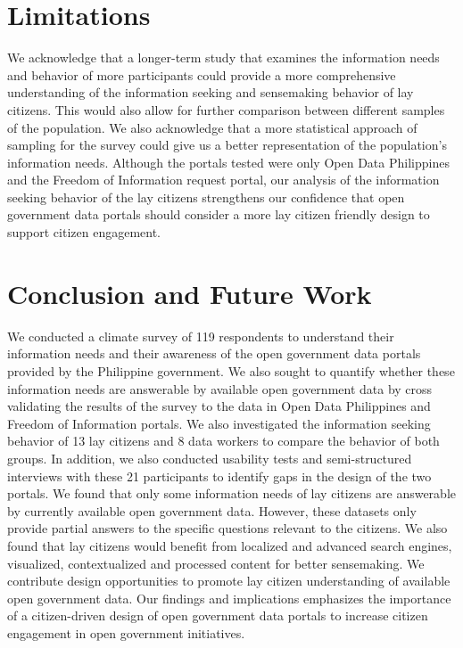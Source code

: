 \documentclass{sigchi}
\begin{document}
\section{Limitations}
We acknowledge that a longer-term study that examines the information needs and behavior of more participants could provide a more comprehensive understanding of the information seeking and sensemaking behavior of lay citizens. This would also allow for further comparison between different samples of the population. We also acknowledge that a more statistical approach of sampling for the survey could give us a better representation of the population's information needs. Although the portals tested were only Open Data Philippines and the Freedom of Information request portal, our analysis of the information seeking behavior of the lay citizens strengthens our confidence that open government data portals should consider a more lay citizen friendly design to support citizen engagement.

\section{Conclusion and Future Work}
We conducted a climate survey of 119 respondents to understand their information needs and their awareness of the open government data portals provided by the Philippine government. We also sought to quantify whether these information needs are answerable by available open government data by cross validating the results of the survey to the data in Open Data Philippines and Freedom of Information portals. We also investigated the information seeking behavior of 13 lay citizens and 8 data workers to compare the behavior of both groups. In addition, we also conducted usability tests and semi-structured interviews with these 21 participants to identify gaps in the design of the two portals. We found that only some information needs of lay citizens are answerable by currently available open government data. However, these datasets only provide partial answers to the specific questions relevant to the citizens. We also found that lay citizens would benefit from localized and advanced search engines, visualized, contextualized and processed content for better sensemaking. We contribute design opportunities to promote lay citizen understanding of available open government data. Our findings and implications emphasizes the importance of a citizen-driven design of open government data portals to increase citizen engagement in open government initiatives.
\end{document}
